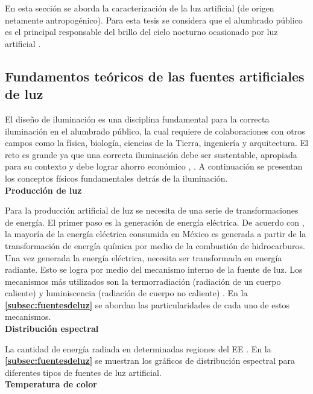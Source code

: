 En esta sección se aborda la caracterización de la luz artificial (de origen netamente antropogénico). Para esta tesis se considera que el alumbrado público es el principal responsable del brillo del cielo nocturno ocasionado por luz artificial \citep{Solano2013b}.

\subsection{Fundamentos teóricos de las fuentes artificiales de luz}

El diseño de iluminación es una disciplina fundamental para la correcta iluminación en el alumbrado público, la cual requiere de colaboraciones con otros campos como la física, biología, ciencias de la Tierra, ingeniería y arquitectura. El reto es grande ya que una correcta iluminación debe ser sustentable, apropiada para su contexto y debe lograr ahorro económico \citep{LibroCL}, \citep{Globaldiscussion}. A continuación se presentan los conceptos físicos fundamentales detrás de la iluminación.\\


\textbf{Producción de luz}

Para la producción artificial de luz se necesita de una serie de transformaciones de energía. El primer paso es la generación de energía eléctrica. De acuerdo con \cite{Ramos2012}, la mayoría de la energía eléctrica consumida en México es generada a partir de la transformación de energía química por medio de la combustión de hidrocarburos.\\

Una vez generada la energía eléctrica, necesita ser transformada en energía radiante. Esto se logra por medio del mecanismo interno de la fuente de luz. Los mecanismos más utilizados son la termorradiación (radiación de un cuerpo caliente) y luminiscencia (radiación de cuerpo no caliente) \citep{LibroCL}. En la \textbf{\autoref{subsec:fuentesdeluz}} se abordan las particularidades de cada uno de estos mecanismos.\\


\textbf{Distribución espectral}

La cantidad de energía radiada en determinadas regiones del EE \citep{Solano2013}. En la \textbf{\autoref{subsec:fuentesdeluz}} se muestran los gráficos de distribución espectral para diferentes tipos de fuentes de luz artificial.\\

  
\textbf{Temperatura de color}


